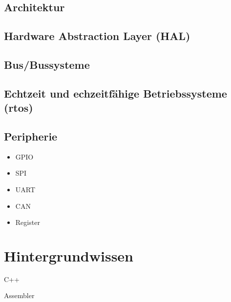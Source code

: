 \subsection*{Architektur}

\subsection*{Hardware Abstraction Layer (HAL)}

\subsection*{Bus/Bussysteme}

\subsection*{Echtzeit und echzeitfähige Betriebssysteme (\gls{rtos})}

\subsection*{Peripherie}
\begin{itemize}
	\item GPIO
	\item SPI
	\item UART
	\item CAN
	\item Register %
\end{itemize}


\section{Hintergrundwissen}
C++

Assembler



